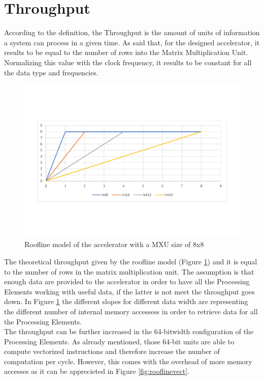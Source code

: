 \section{Throughput}
According to the definition, the Throughput is the amount of units of information a system can process in a given time. As said that, for the designed accelerator, it results to be equal to the number of rows into the Matrix Multiplication Unit. Normalizing this value with the clock frequency, it results to be constant for all the data type and frequencies.
\begin{figure}[!htbp]
\centering
\captionsetup{justification=centering}
\includegraphics[scale=0.45,angle=0]{./figure/graphs/roofline.pdf}
\caption{Roofline model of the accelerator with a MXU size of 8x8}
\label{fig:roofline}
\end{figure}

The theoretical throughput given by the roofline model (Figure \ref{fig:roofline}) and it is equal to the number of rows in the matrix multiplication unit. The assumption is that enough data are provided to the accelerator in order to have all the Processing Elements working with useful data, if the latter is not meet the throughput goes down.
In Figure \ref{fig:roofline} the different slopes for different data width are representing the different number of internal memory accessess in order to retrieve data for all the Processing Elements.\\

The throughput can be further increased in the 64-bitwidth configuration of the Processing Elements. As already mentioned, those 64-bit units are able to compute vectorized instructions and therefore increase the number of computation per cycle. However, this comes with the overhead of more memory accesses as it can be apprecieted in Figure \ref{fig:rooflinevect}.

